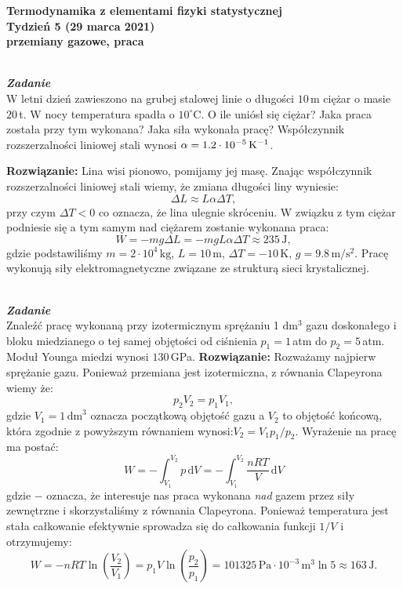 \documentclass[11pt,a4paper]{article}
\newcounter{zadanie}\newcommand{\zadanie}[1][]{\addtocounter{zadanie}{1} ~\\  {\bf \emph{Zadanie \arabic{zadanie} #1 }} \\}
\renewcommand{\t}[1]{\textrm{#1}}
\begin{document}

\begin{centering}
\bf{\Large{Termodynamika z elementami fizyki statystycznej}}\\
Tydzień 5  (29 marca 2021)\\[3mm]
przemiany gazowe, praca \\
\end{centering}
\vspace{5mm}

\zadanie
W letni dzień zawieszono na grubej stalowej linie o długości $10\,$m ciężar o masie $20\,$t.
W nocy temperatura spadła o $10^\circ$C. O ile uniósł się ciężar?
Jaka praca została przy tym wykonana? Jaka siła wykonała pracę?
Współczynnik rozszerzalności liniowej stali wynosi $\alpha = 1.2\cdot 10^{-5}\,{\rm K}^{-1}$.
\vskip 10pt

\textbf{Rozwiązanie:}
Lina wisi pionowo, pomijamy jej masę. Znając współczynnik rozszerzalności liniowej stali wiemy, że
zmiana długości liny wyniesie:
$$
\Delta L \approx L \alpha \Delta T,
$$
przy czym $\Delta T < 0$ co oznacza, że lina ulegnie skróceniu. W związku z tym ciężar podniesie się
a tym samym nad ciężarem zostanie wykonana praca:
$$
W = - mg \Delta L = - mg L \alpha \Delta T \approx 235\,\t{J},
$$
gdzie podstawiliśmy $m=2 \cdot 10^4\,\t{kg}$, $L = 10\,\t{m}$, $\Delta T = -10\,\t{K}$, $g=9.8\,\t{m}/\t{s}^2$.
Pracę wykonują siły elektromagnetyczne związane ze strukturą sieci krystalicznej.

\newpage
\zadanie
Znaleźć pracę wykonaną przy izotermicznym sprężaniu 1 dm$^3$
gazu doskonałego i bloku miedzianego o tej samej objętości od
ciśnienia $p_1=1\,$atm do $p_2=5\,$atm. Moduł Younga miedzi wynosi $130\,$GPa.
\vskip 10pt
\textbf{Rozwiązanie:}
Rozważamy najpierw sprężanie gazu. Ponieważ przemiana jest izotermiczna, z równania Clapeyrona wiemy że:
$$
p_2 V_2 = p_1 V_1,
$$
gdzie $V_1=1\,\t{dm}^3$ oznacza początkową objętość gazu a $V_2$ to objętość końcową, która zgodnie z powyższym równaniem
wynosi:$V_2 =V_1 p_1/p_2$.
Wyrażenie na pracę ma postać:
$$
W = - \int_{V_1}^{V_2} p \,\t{d}V = - \int_{V_1}^{V_2} \frac{n R T}{V} \,\t{d}V
$$
gdzie $-$ oznacza, że interesuje nas praca wykonana \emph{nad} gazem przez siły zewnętrzne i skorzystaliśmy z równania Clapeyrona.
Ponieważ temperatura jest stała całkowanie efektywnie sprowadza się do całkowania funkcji $1/V$ i otrzymujemy:
$$
W = - n R T \ln\left(\frac{V_2}{V_1} \right) = p_1 V \ln\left(\frac{p_2}{p_1}\right) = 
101325\,\t{Pa}\cdot 10^{-3}\,\t{m}^3 \ln 5 \approx 163\, \t{J}.
$$
\end{document}
